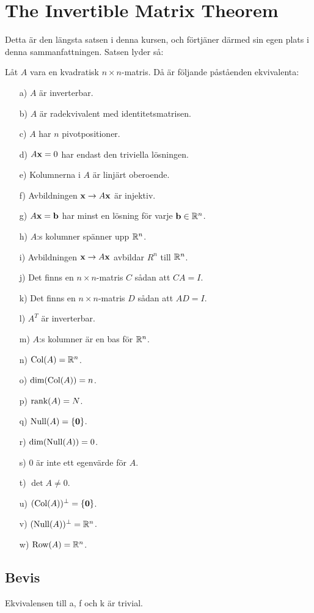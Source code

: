 \section{The Invertible Matrix Theorem}
Detta är den längsta satsen i denna kursen, och förtjäner därmed sin egen plats i denna sammanfattningen. Satsen lyder så:

Låt $A$ vara en kvadratisk $n\times n$-matris. Då är följande påståenden ekvivalenta:
\begin{itemize}
	\item[a)] $A$ är inverterbar.
	\item[b)] $A$ är radekvivalent med identitetsmatrisen.
	\item[c)] $A$ har $n$ pivotpositioner.
	\item[d)] $A\vect{x} = 0$ har endast den triviella lösningen.
	\item[e)] Kolumnerna i $A$ är linjärt oberoende.
	\item[f)] Avbildningen $\vect{x}\to A\vect{x}$ är injektiv.
	\item[g)] $A\vect{x} = \vect{b}$ har minst en lösning för varje $\vect{b}\in\R^n$.
	\item[h)] $A$:s kolumner spänner upp $\mathbb{R}^n$.
	\item[i)] Avbildningen $\vect{x}\to A\vect{x}$ avbildar $R^n$ till $\mathbb{R}^n$.
	\item[j)] Det finns en $n\times n$-matris $C$ sådan att $CA = I$.
	\item[k)] Det finns en $n\times n$-matris $D$ sådan att $AD = I$.
	\item[l)] $A^T$ är inverterbar.
	\item[m)] $A$:s kolumner är en bas för $\mathbb{R}^n$.
	\item[n)] $\text{Col}(A) = \mathbb{R}^n$.
	\item[o)] $\text{dim}(\text{Col}(A)) = n$.
	\item[p)] $\text{rank}(A) = N$.
	\item[q)] $\Null{A} = \{\vect{0}\}$.
	\item[r)] $\text{dim}(\text{Null}(A)) = 0$.
	\item[s)] $0$ är inte ett egenvärde för $A$.
	\item[t)] $\det{A}\neq 0$.
	\item[u)] $(\Col{A})^\perp = \{\vect{0}\}$.
	\item[v)] $(\text{Null}(A))^\perp = \mathbb{R}^n$.
	\item[w)] $\text{Row}(A) = \mathbb{R}^n$.
\end{itemize}

\subsection{Bevis}
Ekvivalensen till a, f och k är trivial.